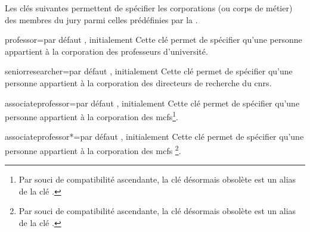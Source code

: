 Les clés suivantes\syntaxeoptions{} permettent de spécifier les corporations (ou
corps de métier) des membres du jury parmi celles prédéfinies par la \yatCl{}.

\begin{docKey}{professor}{=\textbar{}}{par défaut
    , initialement }
  Cette clé permet de spécifier qu'une personne appartient à la corporation des
  professeurs d'université.
\end{docKey}
%
\begin{docKey}{seniorresearcher}{=\textbar{}}{par
    défaut , initialement }
  Cette clé permet de spécifier qu'une personne appartient à la corporation des
  directeurs de recherche du \gls{cnrs}.
\end{docKey}
%
\begin{docKey}[][doc updated=2016-10-30]{associateprofessor}{=\textbar{}}{par défaut
    , initialement }
  Cette clé permet de spécifier qu'une personne appartient à la corporation des
  \glspl{mcf}\footnote{Par souci de compatibilité ascendante, la clé désormais
    obsolète  est un alias de la clé .}.
\end{docKey}
%
\begin{docKey}[][doc updated=2016-10-30]{associateprofessor*}{=\textbar{}}{par défaut
    , initialement }
  Cette clé permet de spécifier qu'une personne appartient à la corporation des
  \glspl{mcf} \footnote{Par souci de compatibilité
    ascendante, la clé désormais obsolète  est un alias de la clé
    .}.
\end{docKey}

